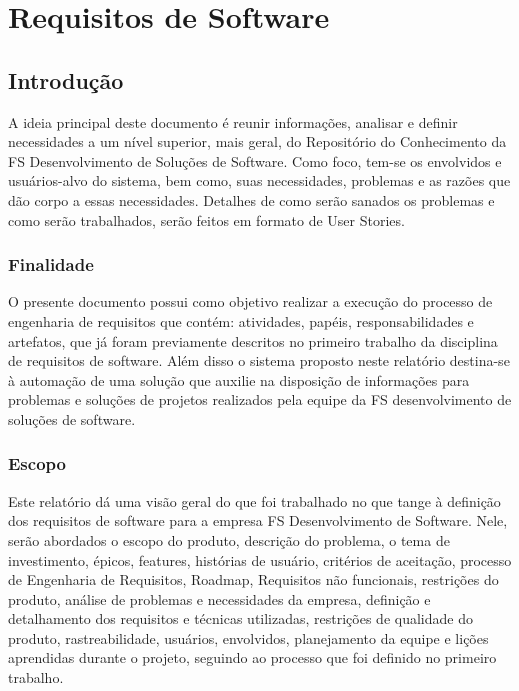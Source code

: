 \chapter[Requisitos de Software]{Requisitos de Software}

\section{Introdução}
A ideia principal deste documento é reunir informações, analisar e definir necessidades a um nível superior, mais geral, do Repositório do Conhecimento da FS Desenvolvimento de Soluções de Software. Como foco, tem-se os envolvidos e usuários-alvo do sistema, bem como, suas necessidades, problemas e as razões que dão corpo a essas necessidades. Detalhes de como serão sanados os problemas e como serão trabalhados, serão feitos em formato de User Stories.

\subsection{Finalidade}
O presente documento possui como objetivo realizar a execução do processo de engenharia de requisitos que contém: atividades,  papéis, responsabilidades e artefatos, que já foram previamente descritos no primeiro trabalho da disciplina de requisitos de software. 
Além disso o sistema proposto neste relatório destina-se à automação de uma  solução que auxilie na disposição de informações para problemas e soluções de projetos realizados pela equipe da FS desenvolvimento de soluções de software.

\subsection{Escopo}
Este relatório dá uma visão geral do que foi trabalhado no que tange à definição dos requisitos de software para a empresa FS Desenvolvimento de Software. Nele, serão abordados o escopo do produto, descrição do problema, o tema de investimento, épicos, features, histórias de usuário, critérios de aceitação, processo de Engenharia de Requisitos, Roadmap, Requisitos não funcionais, restrições do produto, análise de problemas e necessidades da empresa, definição e detalhamento dos requisitos e técnicas utilizadas, restrições de qualidade do produto, rastreabilidade, usuários, envolvidos, planejamento da equipe e lições aprendidas durante o projeto, seguindo ao processo que foi definido no primeiro trabalho. 

